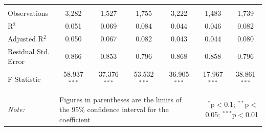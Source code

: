 \documentclass[alpha-refs]{wiley-article-01g}
\begin{document}
\begin{landscape}
\begin{table}[!htbp]
\begin{tabular}{@{\extracolsep{5pt}}lcccccc}
  & & & & & & \\ 
\hline \\[-3ex] 
Observations & 3,282 & 1,527 & 1,755 & 3,222 & 1,483 & 1,739 \\ 
R$^{2}$ & 0.051 & 0.069 & 0.084 & 0.044 & 0.046 & 0.082 \\ 
Adjusted R$^{2}$ & 0.050 & 0.067 & 0.082 & 0.043 & 0.044 & 0.080 \\ 
Residual Std. Error & 0.866 & 0.853 & 0.796 & 0.868 & 0.858 & 0.796 \\ 
F Statistic & 58.937$^{***}$ & 37.376$^{***}$ & 53.532$^{***}$ & 36.905$^{***}$ & 17.967$^{***}$ & 38.861$^{***}$ \\ 
\hline 
\hline \\[-3ex] 
\textit{Note:} &\multicolumn{4}{l}{Figures in parentheses are the limits of the 95\% confidence interval for the coefficient}  & \multicolumn{2}{r}{$^{*}$p$<$0.1; $^{**}$p$<$0.05; $^{***}$p$<$0.01} \\ 
\end{tabular} 
\end{table} 

\end{landscape}

\newpage
\end{document}
